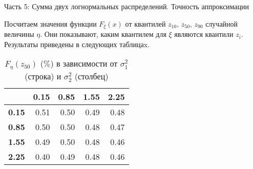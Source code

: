 \documentclass[ucs, notheorems, handout]{beamer}
\begin{document}
\begin{frame}{Часть 5: Сумма двух логнормальных распределений. Точность аппроксимации}
	
	Посчитаем значения функции $F_{\xi}(x)$ от квантилей $z_{10}$, $z_{50}$, $z_{90}$ случайной величины $\eta$. Они показывают, каким квантилем для $\xi$ являются квантили $z_{i}$. Результаты приведены в следующих таблицаx.
	
	\begin{table}[!hhh]
		\centering
		\caption{$F_{\eta}(z_{50})$ ($\%$) в зависимости от $\sigma_{1}^{2}$ (строка) и $\sigma_{2}^{2}$ (столбец) }
		\label{tab4}
		\begin{tabular}{rrrrr}
			\hline
			& \textbf{0.15} & \textbf{0.85} & \textbf{1.55} & \textbf{2.25} \\
			\hline
			\textbf{0.15} & 0.51 & 0.50 & 0.49 & 0.48 \\ 
			\textbf{0.85} & 0.50 & 0.50 & 0.48 & 0.47 \\ 
			\textbf{1.55} & 0.49 & 0.50 & 0.48 & 0.46 \\ 
			\textbf{2.25} & 0.40 & 0.49 & 0.48 & 0.46 \\ 
			\hline
		\end{tabular}
	\end{table}	
\end{frame}
\end{document}

